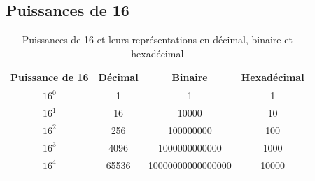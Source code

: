 \documentclass[12pt]{article}
\begin{document}
\subsection{Puissances de 16}

\begin{table}[h]
    \centering
    \begin{tabular}{|c|c|c|c|}
    \hline
    Puissance de 16 & Décimal & Binaire & Hexadécimal \\
    \hline
    $16^0$  & 1          & 1                 & 1 \\
    \hline
    $16^1$  & 16         & 10000             & 10 \\
    \hline
    $16^2$  & 256        & 100000000         & 100 \\
    \hline
    $16^3$  & 4096       & 1000000000000     & 1000 \\
    \hline
    $16^4$  & 65536      & 10000000000000000 & 10000 \\
    \hline
    \end{tabular}
    \caption{Puissances de 16 et leurs représentations en décimal, binaire et hexadécimal}
    \label{tab:puissances_de_16}
\end{table}
\end{document}
